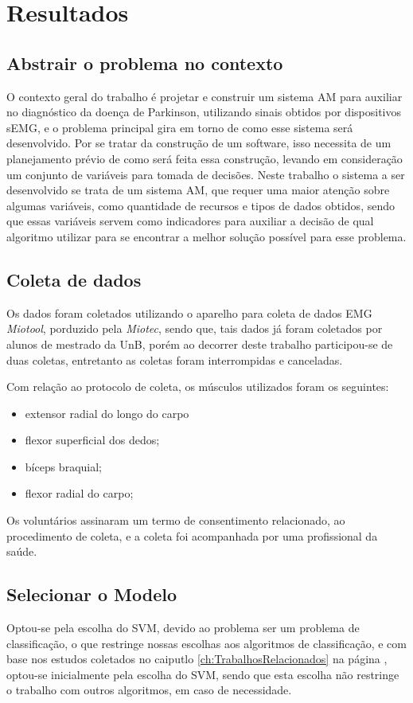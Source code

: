 \chapter{Resultados}
\label{ch:Resultados}
\section{Abstrair o problema no contexto}
O contexto geral do trabalho é projetar e construir um sistema AM para auxiliar no diagnóstico da doença de Parkinson, utilizando sinais obtidos por dispositivos sEMG, e o problema principal gira em torno de como esse sistema será desenvolvido. Por se tratar da construção de um software, isso necessita de um planejamento prévio de como será feita essa construção, levando em consideração um conjunto de variáveis para tomada de decisões. Neste trabalho o sistema a ser desenvolvido se trata de um sistema AM, que requer uma maior atenção sobre algumas variáveis, como quantidade de recursos e tipos de dados obtidos, sendo que essas variáveis servem como indicadores para auxiliar a decisão de qual algoritmo utilizar para se encontrar a melhor solução possível para esse problema.

\section{Coleta de dados}
Os dados foram coletados utilizando o aparelho para coleta de dados EMG \textit{Miotool}, porduzido pela \textit{Miotec}, sendo que, tais dados já foram coletados por alunos de mestrado da UnB, porém ao decorrer deste trabalho participou-se de duas coletas, entretanto as coletas foram interrompidas e canceladas.

Com relação ao protocolo de coleta, os músculos utilizados foram os seguintes:
\begin{itemize}
\item extensor radial do longo do carpo
\item flexor superficial dos dedos;
\item bíceps braquial;
\item flexor radial do carpo;
\end{itemize}

Os voluntários assinaram um termo de consentimento relacionado, ao procedimento de coleta, e a coleta foi acompanhada por uma profissional da saúde.
 
\section{Selecionar o Modelo}
Optou-se pela escolha do SVM, devido ao problema ser um problema de classificação, o que restringe nossas escolhas aos algoritmos de classificação, e com base nos estudos coletados no caiputlo \ref{ch:TrabalhosRelacionados} na página \pageref{ch:TrabalhosRelacionados}, optou-se inicialmente pela escolha do SVM, sendo que esta escolha não restringe o trabalho com outros algoritmos, em caso de necessidade.

